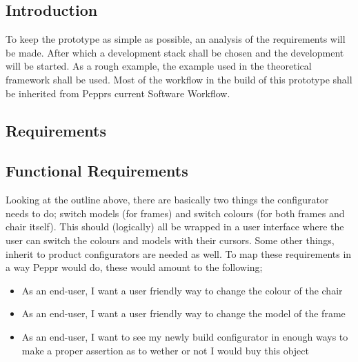 \subsection{Introduction}
To keep the prototype as simple as possible, an analysis of the requirements will be made. After which a development stack shall be chosen and the development will be started. As a rough example, the example used in the theoretical framework shall be used. Most of the workflow in the build of this prototype shall be inherited from Pepprs current Software Workflow.


\subsection{Requirements}

\subsection{Functional Requirements}
Looking at the outline above, there are basically two things the configurator needs to do; switch models (for frames) and switch colours (for both frames and chair itself). This should (logically) all be wrapped in a user interface where the user can switch the colours and models with their cursors. Some other things, inherit to product configurators are needed as well. To map these requirements in a way Peppr would do, these would amount to the following;

\begin{itemize}
	\item As an end-user, I want a user friendly way to change the colour of the chair
	\item As an end-user, I want a user friendly way to change the model of the frame
	\item As an end-user, I want to see my newly build configurator in enough ways to make a proper assertion as to wether or not I would buy this object
\end{itemize}


